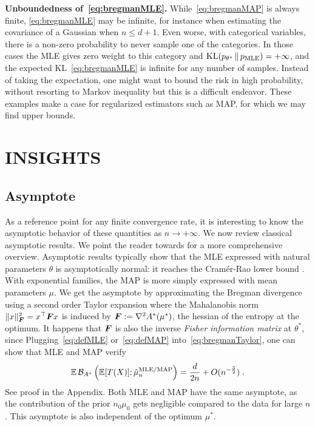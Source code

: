 \documentclass[twoside]{article}
\let\oldsection\section
\renewcommand{\section}[1]{\oldsection{\texorpdfstring{\uppercase{#1}}{#1}}}
\newcommand{\logpart}{A}
\newcommand{\conj}{\logpart^*}
\newcommand{\bregmanconj}{\cB_{\logpart^*}}
\newcommand{\nat}{\theta}
\newcommand{\m}{\mu}
\newcommand{\meanp}{\m}
\begin{document}
{\bf Unboundedness of~\eqref{eq:bregmanMLE}.}
While~\eqref{eq:bregmanMAP} is always finite, \eqref{eq:bregmanMLE} may be infinite,
for instance when estimating the covariance of a Gaussian when $n \leq d + 1$.
Even worse, with categorical variables, there is a non-zero probability to never sample one of the categories.
In those cases the MLE gives zero weight to this category and $\KL(p_{\nat^*} \,\Vert\, p_\text{MLE} ) = +\infty$,
and the expected KL~\eqref{eq:bregmanMLE} is infinite for any number of samples.
Instead of taking the expectation, one might want to bound the risk in high probability,
without resorting to Markov inequality but this is a difficult endeavor.
These examples make a case for regularized estimators such as MAP,
for which we may find upper bounds.

\section{Insights}
\label{sec:insights}

\subsection{Asymptote}
\label{ssec:asymptote}
As a reference point for any finite convergence rate, it is interesting to know the asymptotic behavior of these quantities as $n \rightarrow +\infty$.
We now review classical asymptotic results.
We point the reader towards \citet[\S1.1]{ostrovskii2021finite} for a more comprehensive overview.
Asymptotic results typically show that the MLE expressed with natural parameters $\nat$ is asymptotically normal: it reaches the Cramér-Rao lower bound \citep[for instance Ch4.2]{vdv1998asymptotic}.
With exponential families, the MAP is more simply expressed with mean parameters $\meanp$.
We get the asymptote by approximating the Bregman divergence using a second order Taylor expansion
\alignn{
    \bregmanconj(\m^* ; \m)
    &= \frac{\norm{\m^* - \m}^2_{\mF}}{2}
    + O(\norm{\m - \m^*}^3),
    \label{eq:bregmanTaylor}
}
where the Mahalanobis norm  $\| x \|_{{\bm{F}}}^2 = x^\top {\bm{F}} x$  is induced by $\mF  := \nabla^2\conj(\m^*)$, the hessian of the entropy at the optimum. It happens that  ${\bm{F}}$ is also the inverse \textit{Fisher information matrix} at $\nat^*$, since
\aligns{
    \mF
    :=\nabla^2\conj(\m^*)
    = \nabla^2\logpart(\nat^*)^{-1}
    = \Cov_{\nat^*}[T(X)]^{-1}  \; .
}
Plugging~\eqref{eq:defMLE} or~\eqref{eq:defMAP} into~\eqref{eq:bregmanTaylor}, one can show that MLE and MAP verify
\begin{align}
	\label{eq:MAP_asymptote}
	\E \bregmanconj \left (\E [T(X)] ; \hat \meanp_n^\text{MLE/MAP} \right )
	= \frac{d}{2n} + O(n^{- \frac{3}{2}}) \; .
\end{align}
See proof in the Appendix.
Both MLE and MAP have the same asymptote, as the contribution of the prior $n_0 \meanp_0$ gets negligible compared to the data for large $n$.
This asymptote is also independent of the optimum $\meanp^*$.
\end{document}
